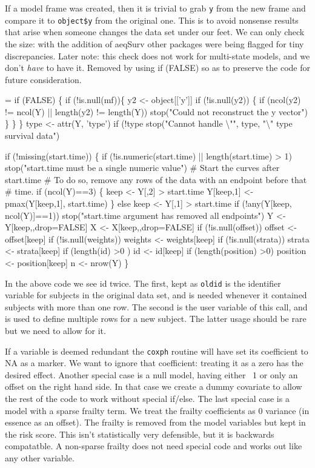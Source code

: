 \documentclass{article}
\newcommand{\code}[1]{\texttt{#1}}
\begin{document}
If a model frame was created, then it is trivial to grab \code{y}
from the new frame and compare it to \code{object\$y} from the
original one.  This is to avoid nonsense results that arise
when someone changes the data set under our feet. 
We can only check the size: with the addition of aeqSurv other packages
were being flagged for tiny discrepancies.
Later note: this check does not work for multi-state models, and we don't
\emph{have} to have it.  Removed by using if (FALSE) so as to preserve
the code for future consideration.
\begin{nwchunk}
=
 if (FALSE) \{
 if (!is.null(mf))\{
     y2 <- object[['y']]
     if (!is.null(y2)) \{
         if (ncol(y2) != ncol(Y) || length(y2) != length(Y))
             stop("Could not reconstruct the y vector")
     \}
 \}
 \}
 type <- attr(Y, 'type')
 if (!type %
     stop("Cannot handle {\textbackslash}"", type, "{\textbackslash}" type survival data")
 
 if (!missing(start.time)) \{
     if (!is.numeric(start.time) || length(start.time) > 1)
         stop("start.time must be a single numeric value")
     # Start the curves after start.time
     # To do so, remove any rows of the data with an endpoint before that
     #  time.
     if (ncol(Y)==3) \{
         keep <- Y[,2] > start.time
         Y[keep,1] <- pmax(Y[keep,1], start.time)
     \}
     else keep <- Y[,1] > start.time
     if (!any(Y[keep, ncol(Y)]==1)) 
         stop("start.time argument has removed all endpoints")
     Y <- Y[keep,,drop=FALSE]
     X <- X[keep,,drop=FALSE]
     if (!is.null(offset)) offset <- offset[keep]
     if (!is.null(weights)) weights <- weights[keep]
     if (!is.null(strata))  strata <- strata[keep]
     if (length(id) >0 ) id <- id[keep]
     if (length(position) >0) position <- position[keep]
     n <- nrow(Y)
 \}
\end{nwchunk}

In the above code we see id twice. The first, kept as \code{oldid} is the
identifier variable for subjects in the original data set, and is needed
whenever it contained subjects with more than one row.  
The second is the user variable of this call, and is used to define multiple
rows for a new subject.  The latter usage should be rare but we need to
allow for it.

If a variable is deemed redundant the \code{coxph} routine will have set its
coefficient to NA as a marker. 
We want to ignore that coefficient: treating it as a zero has the 
desired effect.
Another special case is a null model, having either ~1 or only an offset
on the right hand side.  In that case we create a dummy covariate to
allow the rest of the code to work without special if/else.
The last special case is a model with a sparse frailty term.  We treat
the frailty coefficients as 0 variance (in essence as an offset).
The frailty is removed from the model variables but kept in the risk score.
This isn't statistically very defensible, but it is backwards compatatble. %
A non-sparse frailty does not need special code and works out like any
other variable.  
\end{document}
